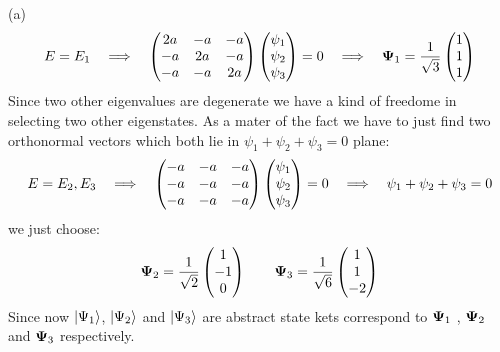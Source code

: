 \begin{homeworkProblem}
\begin{homeworkSection}{(a)}
\begin{equation}
E=E_1\quad \Longrightarrow\quad 
\begin{pmatrix}
2a  & -a &-a\\
-a& 2a &-a\\
-a&-a& 2a
\end{pmatrix}
\begin{pmatrix}
\psi_1\\
\psi_2\\
\psi_3
\end{pmatrix}
=0
\quad\Longrightarrow\quad
\mathbf{\Psi}_1=
\frac{1}{\sqrt{3}}
\begin{pmatrix}
1\\
1\\
1
\end{pmatrix}
\end{equation}
Since two other eigenvalues are degenerate we have a kind of freedome in selecting two other eigenstates. As a mater of the fact we have to just find two orthonormal vectors which both lie in $\psi_1+\psi_2+\psi_3=0$ plane:
\begin{equation}
E=E_2,E_3\quad \Longrightarrow\quad 
\begin{pmatrix}
-a  & -a &-a\\
-a& -a &-a\\
-a&-a& -a
\end{pmatrix}
\begin{pmatrix}
\psi_1\\
\psi_2\\
\psi_3
\end{pmatrix}
=0
\quad\Longrightarrow\quad
\psi_1+\psi_2+\psi_3=0
\end{equation}
 we just choose:
 \begin{equation}
 \mathbf{\Psi}_2=
 \frac{1}{\sqrt{2}}
 \begin{pmatrix}
1\\
-1\\
0
\end{pmatrix}
\qquad
\mathbf{\Psi}_3=
 \frac{1}{\sqrt{6}}
 \begin{pmatrix}
1\\
1\\
-2
\end{pmatrix}
 \end{equation}
 Since now $|\Psi_1\rangle$, $|\Psi_2\rangle$ and $|\Psi_3\rangle$ are abstract state kets correspond to $\mathbf{\Psi}_1$ , $\mathbf{\Psi}_2$ and $\mathbf{\Psi}_3$ respectively. 


\end{homeworkSection}
\end{homeworkProblem}
